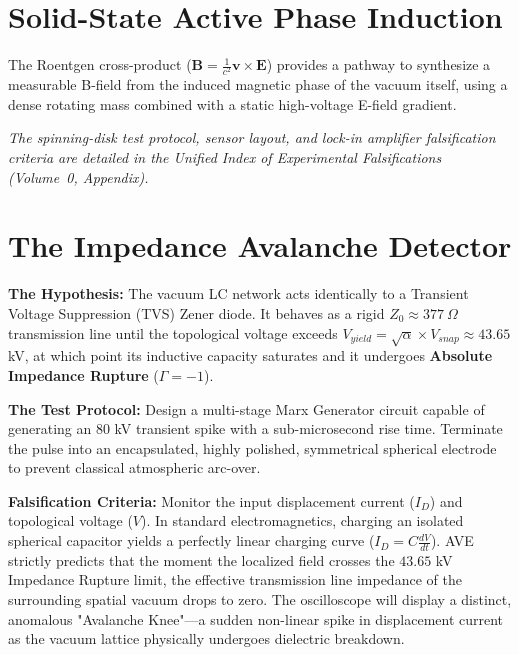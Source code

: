 \section{Solid-State Active Phase Induction}

The Roentgen cross-product ($\mathbf{B} = \frac{1}{c^2} \mathbf{v} \times \mathbf{E}$) provides a pathway to synthesize a measurable B-field from the induced magnetic phase of the vacuum itself, using a dense rotating mass combined with a static high-voltage E-field gradient.

\textit{The spinning-disk test protocol, sensor layout, and lock-in amplifier falsification criteria are detailed in the Unified Index of Experimental Falsifications (Volume~0, Appendix).}

\section{The Impedance Avalanche Detector}
\textbf{The Hypothesis:} The vacuum LC network acts identically to a Transient Voltage Suppression (TVS) Zener diode. It behaves as a rigid $Z_0 \approx 377 \ \Omega$ transmission line until the topological voltage exceeds $V_{yield} = \sqrt{\alpha} \times V_{snap} \approx 43.65$ kV, at which point its inductive capacity saturates and it undergoes \textbf{Absolute Impedance Rupture} ($\Gamma = -1$\gammaundeclared{}).

\textbf{The Test Protocol:} Design a multi-stage Marx Generator circuit capable of generating an $80$ kV transient spike with a sub-microsecond rise time. Terminate the pulse into an encapsulated, highly polished, symmetrical spherical electrode to prevent classical atmospheric arc-over.

\textbf{Falsification Criteria:} Monitor the input displacement current ($I_D$) and topological voltage ($V$). In standard electromagnetics, charging an isolated spherical capacitor yields a perfectly linear charging curve ($I_D = C \frac{dV}{dt}$). AVE strictly predicts that the moment the localized field crosses the $43.65$ kV Impedance Rupture limit, the effective transmission line impedance of the surrounding spatial vacuum drops to zero. The oscilloscope will display a distinct, anomalous "Avalanche Knee"---a sudden non-linear spike in displacement current as the vacuum lattice physically undergoes dielectric breakdown.

